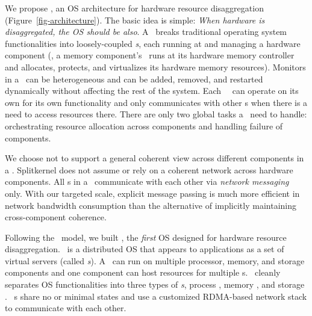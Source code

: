 \documentclass[10pt,times,twocolumn]{z2-article}
\begin{document}


We propose {\em \splitkernel}, an OS architecture for hardware resource disaggregation (Figure~\ref{fig-architecture}).
The basic idea is simple: \textit{When hardware is disaggregated, the OS should be also}.  
A \splitkernel\ breaks traditional operating system functionalities into loosely-coupled {\em \microos{}s},
each running at and managing a hardware component
(\eg, a memory component's \microos\ runs at its hardware memory controller and allocates, protects, and virtualizes its hardware memory resources).
Monitors in a \splitkernel\ can be heterogeneous and can be added, removed, 
and restarted dynamically without affecting the rest of the system.
Each \splitkernel\ \microos\ can operate on its own for its own functionality and
only communicates with other \microos{}s when there is a need to access resources there.
There are only two global tasks a \splitkernel\ need to handle: 
orchestrating resource allocation across components 
and handling failure of components.


We choose not to support a general coherent view across different components in a \splitkernel.
Splitkernel does not assume or rely on a coherent network across hardware components.
All \microos{}s in a \splitkernel\ communicate with each other via {\em network messaging} only.
With our targeted scale, explicit message passing is much more efficient in network bandwidth consumption 
than the alternative of implicitly maintaining cross-component coherence.

Following the \splitkernel\ model, 
we built \lego, the {\em first} OS designed for hardware resource disaggregation.
\lego\ is a distributed OS that appears to applications as a set of virtual servers (called {\em \vnode{}s}).
A \vnode\ can run on multiple processor, memory, and storage components
and one component can host resources for multiple \vnode{}s.
\lego\ cleanly separates OS functionalities into %
three types of {\em \microos{}s},
process \microos, memory \microos, and storage \microos. %
\lego\ \microos{}s share no or minimal states
and use a customized RDMA-based network stack to communicate with each other.
\end{document}
